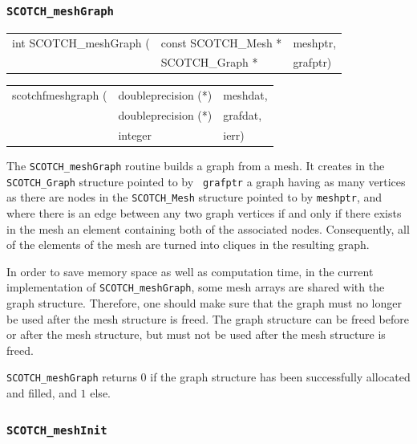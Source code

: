 \subsubsection{{\tt SCOTCH\_meshGraph}}

\begin{itemize}
\progsyn

{\tt\begin{tabular}{l@{}ll}
int SCOTCH\_meshGraph ( & const SCOTCH\_Mesh * & meshptr, \\
                        & SCOTCH\_Graph *      & grafptr)
\end{tabular}}

{\tt\begin{tabular}{l@{}ll}
scotchfmeshgraph ( & doubleprecision (*) & meshdat, \\
                   & doubleprecision (*) & grafdat, \\
                   & integer             & ierr)
\end{tabular}}

\progdes

The {\tt SCOTCH\_meshGraph} routine builds a graph from a mesh. It
creates in the {\tt SCOTCH\_\lbt Graph} structure pointed to by {\tt
grafptr} a graph having as many vertices as there are nodes in the
{\tt SCOTCH\_\lbt Mesh} structure pointed to by {\tt meshptr}, and
where there is an edge between any two graph vertices if and only if
there exists in the mesh an element containing both of the associated
nodes. Consequently, all of the elements of the mesh are turned into
cliques in the resulting graph.

In order to save memory space as well as computation time, in the
current implementation of {\tt SCOTCH\_meshGraph}, some mesh
arrays are shared with the graph structure. Therefore, one should make
sure that the graph must no longer be used after the mesh structure
is freed. The graph structure can be freed before or after the mesh
structure, but must not be used after the mesh structure is freed.

\progret

{\tt SCOTCH\_meshGraph} returns $0$ if the graph structure has been
successfully allocated and filled, and $1$ else.
\end{itemize}

\subsubsection{{\tt SCOTCH\_meshInit}}
\label{sec-lib-func-meshinit}


